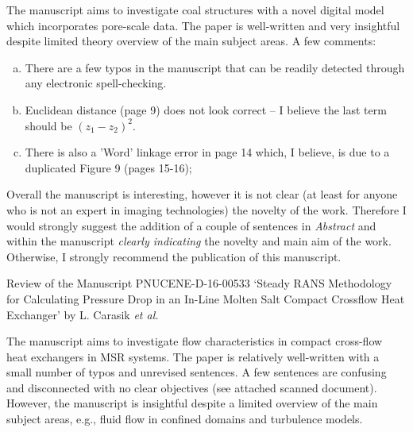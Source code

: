 \documentclass[14pt,twoside]{report}
\begin{document}
\medskip
The manuscript aims to investigate coal structures with a novel digital model which incorporates pore-scale data. The paper is well-written and very insightful despite limited theory overview of the main subject areas. A few comments:
\begin{enumerate}[(a)]
    \item There are a few typos in the manuscript that can be readily detected through any electronic spell-checking.
    \item Euclidean distance (page 9) does not look correct -- I believe the last term should be $\left(z_{1}-z_{2}\right)^{2}$.
    \item There is also a 'Word' linkage error in page 14 which, I believe, is due to a duplicated Figure 9 (pages 15-16);
\end{enumerate}
Overall the manuscript is interesting, however it is not clear (at least for anyone who is not an expert in imaging technologies) the novelty of the work. Therefore I would strongly suggest the addition of a couple of sentences in {\it Abstract} and within the manuscript {\it clearly indicating} the novelty and main aim of the work. Otherwise, I strongly recommend the publication of this manuscript. 
\medskip
{
  }


\clearpage




\begin{center}
  {\Large Review of the Manuscript PNUCENE-D-16-00533 `Steady RANS Methodology for Calculating Pressure Drop in an In-Line Molten Salt Compact Crossflow Heat Exchanger' by L. Carasik {\it et al.}}
\end{center}

\medskip
The manuscript aims to investigate flow characteristics in compact cross-flow heat exchangers in MSR systems. The paper is relatively well-written with a small number of typos and unrevised sentences. A few sentences are confusing and disconnected with no clear objectives (see attached scanned document).  However, the manuscript is insightful despite a limited overview of the main subject areas, e.g., fluid flow in confined domains and turbulence models.
\end{document}
